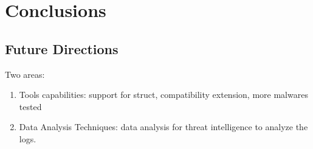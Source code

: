 
\chapter{Conclusions}

\lipsum[23]

\section{Future Directions}

Two areas:
\begin{enumerate}
\item Tools capabilities: support for struct, compatibility extension, more malwares tested
\item Data Analysis Techniques: data analysis for threat intelligence to analyze the logs.
\end{enumerate}